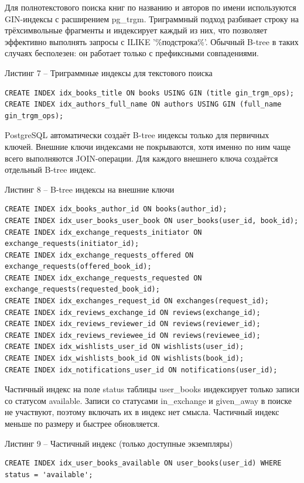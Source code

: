 \documentclass[14pt,a4paper]{extarticle}
\begin{document}
Для полнотекстового поиска книг по названию и авторов по имени
используются GIN-индексы с расширением pg\_trgm. Триграммный подход
разбивает строку на трёхсимвольные фрагменты и индексирует каждый из
них, что позволяет эффективно выполнять запросы с ILIKE
'\%подстрока\%'. Обычный B-tree в таких
случаях бесполезен: он работает только с префиксными совпадениями.

\begin{center}
Листинг 7 -- Триграммные индексы для текстового поиска
\end{center}
\begin{lstlisting}
CREATE INDEX idx_books_title ON books USING GIN (title gin_trgm_ops);
CREATE INDEX idx_authors_full_name ON authors USING GIN (full_name gin_trgm_ops);
\end{lstlisting}

PostgreSQL автоматически создаёт B-tree индексы только для первичных
ключей. Внешние ключи индексами не покрываются, хотя именно по ним чаще
всего выполняются JOIN-операции. Для каждого внешнего ключа создаётся
отдельный B-tree индекс.

\begin{center}
Листинг 8 -- B-tree индексы на внешние ключи
\end{center}
\begin{lstlisting}
CREATE INDEX idx_books_author_id ON books(author_id);
CREATE INDEX idx_user_books_user_book ON user_books(user_id, book_id);
CREATE INDEX idx_exchange_requests_initiator ON exchange_requests(initiator_id);
CREATE INDEX idx_exchange_requests_offered ON exchange_requests(offered_book_id);
CREATE INDEX idx_exchange_requests_requested ON exchange_requests(requested_book_id);
CREATE INDEX idx_exchanges_request_id ON exchanges(request_id);
CREATE INDEX idx_reviews_exchange_id ON reviews(exchange_id);
CREATE INDEX idx_reviews_reviewer_id ON reviews(reviewer_id);
CREATE INDEX idx_reviews_reviewee_id ON reviews(reviewee_id);
CREATE INDEX idx_wishlists_user_id ON wishlists(user_id);
CREATE INDEX idx_wishlists_book_id ON wishlists(book_id);
CREATE INDEX idx_notifications_user_id ON notifications(user_id);
\end{lstlisting}

Частичный индекс на поле status таблицы user\_books индексирует только
записи со статусом available. Записи со статусами in\_exchange и
given\_away в поиске не участвуют, поэтому включать их в индекс нет
смысла. Частичный индекс меньше по размеру и быстрее обновляется.

\newpage
\begin{center}
Листинг 9 -- Частичный индекс (только доступные экземпляры)
\end{center}
\begin{lstlisting}
CREATE INDEX idx_user_books_available ON user_books(user_id) WHERE
status = 'available';
\end{lstlisting}
\end{document}
